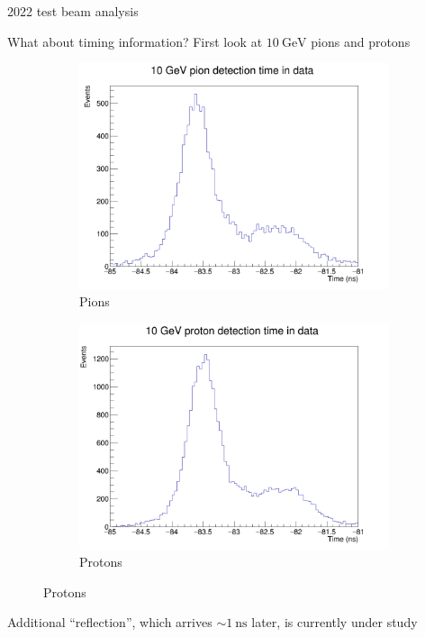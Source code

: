 \documentclass[xcolor={dvipsnames}]{beamer}
\begin{document}
\begin{frame}{2022 test beam analysis}
  \begin{center}
    \Large{What about timing information? First look at $\SI{10}{\giga\eV}$ pions and protons}
  \end{center}
  \begin{figure}
    \centering
    \begin{subfigure}{0.5\textwidth}
      \includegraphics[width = 1.0\textwidth]{Figs/Time_Pos8_Pion_10GeV_Data.png}
      \caption{Pions}
    \end{subfigure}%
    \begin{subfigure}{0.5\textwidth}
      \includegraphics[width = 1.0\textwidth]{Figs/Time_Pos8_Proton_10GeV_Data.png}
      \caption{Protons}
    \end{subfigure}%
  \end{figure}
  \begin{center}
    Additional ``reflection'', which arrives $\sim\SI{1}{\nano\second}$ later, is currently under study\phantom{(}
  \end{center}
\end{frame}
\end{document}
